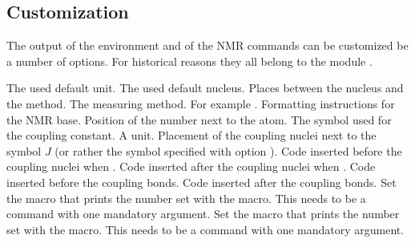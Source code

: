 \documentclass{chemmacros-manual}
\begin{document}
\subsection{Customization}\label{sec:experimental-customization}

The output of the environment and of the NMR commands can be customized be a
number of options.  For historical reasons they all belong to the module
.
\begin{options}
    The used default unit.
    The used default nucleus.
  \Default{-}
    Places  between the nucleus and the method.
    The measuring method.
  \Default
    For example .
  \Default
    Formatting instructions for the NMR base.
    Position of the number next to the atom.
    The symbol used for the coupling constant.
    A  unit.
    Placement of the coupling nuclei next to the symbol $J$ (or rather the
    symbol specified with option ).
  \Default{(}
    Code inserted before the coupling nuclei when .
  \Default{)}
    Code inserted after the coupling nuclei when .
  \Default
    Code inserted before the coupling bonds.
  \Default{\cs*{!}}
    Code inserted after the coupling bonds.
    Set the macro that prints the number set with the  macro.  This
    needs to be a command with one mandatory argument.
    Set the macro that prints the number set with the \cs{\#} macro.  This
    needs to be a command with one mandatory argument.

\end{options}
\end{document}
